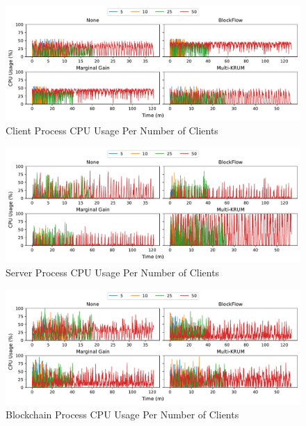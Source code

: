 \clearpage

\begin{figure}[!h]
    \centering
    \includegraphics[width=\textwidth]{graphics/clients/cpu_client.pdf}
    \caption{Client Process CPU Usage Per Number of Clients}
    \label{fig:cpu_clients_clients}
\end{figure}

\vfill

\begin{figure}[!h]
    \centering
    \includegraphics[width=\textwidth]{graphics/clients/cpu_server.pdf}
    \caption{Server Process CPU Usage Per Number of Clients}
    \label{fig:cpu_clients_servers}
\end{figure}

\vfill

\begin{figure}[!h]
    \centering
    \includegraphics[width=\textwidth]{graphics/clients/cpu_miner.pdf}
    \caption{Blockchain Process CPU Usage Per Number of Clients}
    \label{fig:cpu_clients_miners}
\end{figure}

